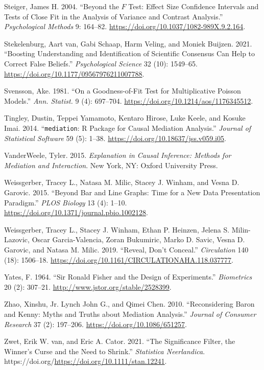 \documentclass[
  11pt,
  letterpaper,
]{scrbook}
\newlength{\cslhangindent}
\newenvironment{CSLReferences}[2] %
 {\begin{list}{}{%
  \setlength{\itemindent}{0pt}
  \setlength{\leftmargin}{0pt}
  \setlength{\parsep}{0pt}
  \ifodd #1
   \setlength{\leftmargin}{\cslhangindent}
   \setlength{\itemindent}{-1\cslhangindent}
  \fi
  \setlength{\itemsep}{#2\baselineskip}}}
 {\end{list}}
\theoremstyle{definition}
\theoremstyle{definition}
\theoremstyle{remark}
\begin{document}
\begin{CSLReferences}{1}{0}
Steiger, James H. 2004. {``Beyond the \(F\) Test: Effect Size Confidence
Intervals and Tests of Close Fit in the Analysis of Variance and
Contrast Analysis.''} \emph{Psychological Methods} 9: 164--82.
\url{https://doi.org/10.1037/1082-989X.9.2.164}.

Stekelenburg, Aart van, Gabi Schaap, Harm Veling, and Moniek Buijzen.
2021. {``Boosting Understanding and Identification of Scientific
Consensus Can Help to Correct False Beliefs.''} \emph{Psychological
Science} 32 (10): 1549--65.
\url{https://doi.org/10.1177/09567976211007788}.

Svensson, Ake. 1981. {``On a Goodness-of-Fit Test for Multiplicative
{P}oisson Models.''} \emph{Ann. Statist.} 9 (4): 697--704.
\url{https://doi.org/10.1214/aos/1176345512}.

Tingley, Dustin, Teppei Yamamoto, Kentaro Hirose, Luke Keele, and Kosuke
Imai. 2014. {``\texttt{mediation}: {R} Package for Causal Mediation
Analysis.''} \emph{Journal of Statistical Software} 59 (5): 1--38.
\url{https://doi.org/10.18637/jss.v059.i05}.

VanderWeele, Tyler. 2015. \emph{Explanation in Causal Inference: Methods
for Mediation and Interaction}. New York, NY: Oxford University Press.

Weissgerber, Tracey L., Natasa M. Milic, Stacey J. Winham, and Vesna D.
Garovic. 2015. {``Beyond Bar and Line Graphs: Time for a New Data
Presentation Paradigm.''} \emph{PLOS Biology} 13 (4): 1--10.
\url{https://doi.org/10.1371/journal.pbio.1002128}.

Weissgerber, Tracey L., Stacey J. Winham, Ethan P. Heinzen, Jelena S.
Milin-Lazovic, Oscar Garcia-Valencia, Zoran Bukumiric, Marko D. Savic,
Vesna D. Garovic, and Natasa M. Milic. 2019. {``Reveal, Don't
Conceal.''} \emph{Circulation} 140 (18): 1506--18.
\url{https://doi.org/10.1161/CIRCULATIONAHA.118.037777}.

Yates, F. 1964. {``Sir {R}onald {F}isher and the Design of
Experiments.''} \emph{Biometrics} 20 (2): 307--21.
\url{http://www.jstor.org/stable/2528399}.

Zhao, Xinshu, Jr. Lynch John G., and Qimei Chen. 2010. {``Reconsidering
{B}aron and {K}enny: Myths and Truths about Mediation Analysis.''}
\emph{Journal of Consumer Research} 37 (2): 197--206.
\url{https://doi.org/10.1086/651257}.

Zwet, Erik W. van, and Eric A. Cator. 2021. {``The Significance Filter,
the Winner's Curse and the Need to Shrink.''} \emph{Statistica
Neerlandica}. https://doi.org/\url{https://doi.org/10.1111/stan.12241}.

\end{CSLReferences}


\backmatter
\end{document}
